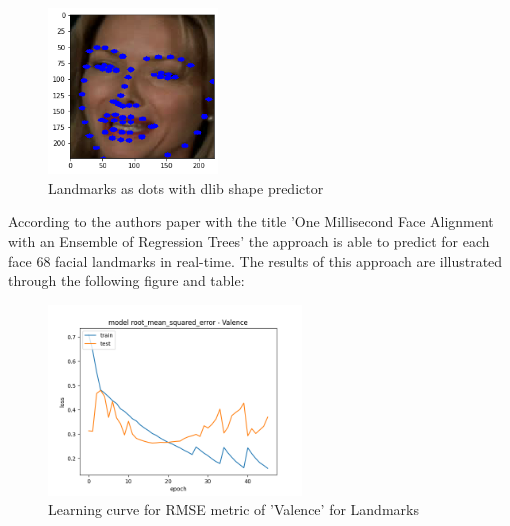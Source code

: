 \begin{figure}[H]
  \begin{center}
  \includegraphics[angle=0, width=0.4\textwidth]{Figures/landmarks_as_dots.png}
  \caption{Landmarks as dots with dlib shape predictor}
  \label{fig:LandmarkdsDots}
  \end{center}
\end{figure}

According to the authors paper with the title 'One Millisecond Face Alignment with an Ensemble of Regression Trees' \citep{Kazemi:2014:ShapePredictor} the approach is able to predict for each face 68 facial landmarks in real-time. The results of this approach are illustrated through the following figure and table:

\begin{figure}[H]
  \begin{center}
  \includegraphics[angle=0, width=0.6\textwidth]{Figures/rmse_out1_landmarks.png}
  \caption{Learning curve for RMSE metric of 'Valence' for Landmarks}
  \label{fig:ASM}
  \end{center}
\end{figure}


